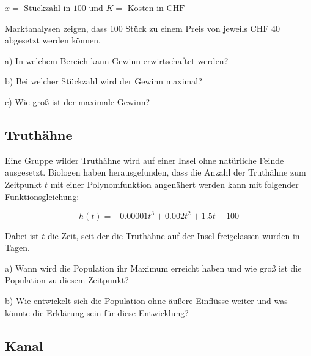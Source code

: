 $x = \text{ Stückzahl in 100}$ und $K = \text{ Kosten in CHF}$

Marktanalysen zeigen, dass 100 Stück zu einem Preis von jeweils CHF 40
abgesetzt werden können.

a) In welchem Bereich kann Gewinn erwirtschaftet werden?

b) Bei welcher Stückzahl wird der Gewinn maximal?

c) Wie groß ist der maximale Gewinn?



\subsection{Truthähne}
Eine Gruppe wilder Truthähne wird auf einer Insel ohne natürliche Feinde ausgesetzt. Biologen haben
herausgefunden, dass die Anzahl der Truthähne zum Zeitpunkt $t$ mit
einer Polynomfunktion angenähert werden kann mit folgender
Funktionsgleichung:

$$h(t) = -0.00001 t^3 + 0.002 t^2 + 1.5t + 100$$

Dabei ist $t$ die Zeit, seit der die Truthähne auf der Insel freigelassen wurden in Tagen.

a)
Wann wird die Population ihr Maximum erreicht haben und wie groß ist die Population zu
diesem Zeitpunkt?

b)
Wie entwickelt sich die Population ohne äußere Einflüsse weiter und was könnte die Erklärung
sein für diese Entwicklung?


\subsection{Kanal}

